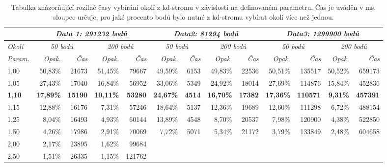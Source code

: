 \documentclass[11pt,twoside,a4paper]{book}
\begin{document}
\begin{table}[ht]
\resizebox{\textwidth}{!} {
\begin{tabular}{|l|r|r|r|r|r|r|r|r|r|r|r|r|}
\hline
\textit{} & \multicolumn{ 4}{c|}{\textit{Data 1: 291232 bodů}} & \multicolumn{ 4}{c|}{\textit{Data2: 81294 bodů}} & \multicolumn{ 4}{c|}{\textit{Data3: 1299900 bodů}} \\ \hline
\textit{Okolí} & \multicolumn{ 2}{c|}{\textit{50 bodů}} & \multicolumn{ 2}{c|}{\textit{200 bodů}} & \multicolumn{ 2}{c|}{\textit{50 bodů}} & \multicolumn{ 2}{c|}{\textit{200 bodů}} & \multicolumn{ 2}{c|}{\textit{50 bodů}} & \multicolumn{ 2}{c|}{\textit{200 bodů}} \\ \hline
\textit{Param.} & \textit{Opak.} & \textit{Čas} & \textit{Opak.} & \textit{Čas} & \textit{Opak.} & \textit{Čas} & \textit{Opak.} & \textit{Čas} & \textit{Opak.} & \textit{Čas} & \textit{Opak.} & \textit{Čas} \\ \hline
1,00 & 50,83\% & 21673 & 51,45\% & 79667 & 49,59\% & 6153 & 49,83\% & 22536 & 50,51\% & 135517 & 50,52\% & 659173 \\ \hline
1,05 & 27,43\% & 17040 & 16,84\% & 56952 & 33,06\% & 5349 & 24,92\% & 18014 & 27,69\% & 114876 & 15,84\% & 452836 \\ \hline
\textbf{1,10} & \textbf{17,89\%} & \textbf{15190} & \textbf{10,11\%} & \textbf{53280} & \textbf{24,67\%} & \textbf{4514} & \textbf{16,70\%} & \textbf{17382} & \textbf{17,36\%} & \textbf{110571} & \textbf{9,31\%} & \textbf{457391} \\ \hline
1,15 & 12,88\% & 16176 & 7,31\% & 57246 & 18,64\% & 5137 & 12,36\% & 19689 & 12,60\% & 111298 & 6,72\% & 488154 \\ \hline
1,25 & 8,04\% & 16493 & 4,93\% & 60144 & 13,89\% & 4548 & 8,70\% & 20537 & 7,98\% & 120900 & 4,38\% & 522850 \\ \hline
1,50 & 4,26\% & 17986 & 2,91\% & 70069 & 7,72\% & 5071 & 5,34\% & 21172 & 3,79\% & 133849 & 2,48\% & 604658 \\ \hline
2,00 & 2,17\% & 23895 & 1,62\% & 99684 & \multicolumn{1}{l|}{} & \multicolumn{1}{l|}{} & \multicolumn{1}{l|}{} & \multicolumn{1}{l|}{} & \multicolumn{1}{l|}{} & \multicolumn{1}{l|}{} & \multicolumn{1}{l|}{} & \multicolumn{1}{l|}{} \\ \hline
2,50 & 1,51\% & 26335 & 1,15\% & 121762 & \multicolumn{1}{l|}{} & \multicolumn{1}{l|}{} & \multicolumn{1}{l|}{} & \multicolumn{1}{l|}{} & \multicolumn{1}{l|}{} & \multicolumn{1}{l|}{} & \multicolumn{1}{l|}{} & \multicolumn{1}{l|}{} \\ \hline
\end{tabular}
}
\caption{Tabulka znázorňující rozílné časy vybírání okolí z kd-stromu v závislosti na definovaném parametru. Čas je uváděn v ms, sloupec  určuje, pro jaké procento bodů bylo nutné z kd-stromu vybírat okolí více než jednou.} 
\label{table:okoli-param}
\end{table}
\end{document}
